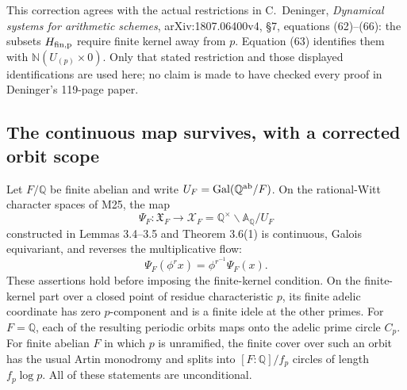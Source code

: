 This correction agrees with the actual restrictions in
C.~Deninger, \emph{Dynamical systems for arithmetic schemes},
arXiv:1807.06400v4, \S7, equations (62)--(66): the subsets
\(H_{\rm fin,p}\) require finite kernel away from \(p\).
Equation (63) identifies them with
\(\mathbb N(U_{(p)}\times0)\).
Only that stated restriction and those displayed identifications
are used here; no claim is made to have checked every proof in
Deninger's 119-page paper.

\subsection{The continuous map survives, with a corrected orbit scope}

\begin{proposition}
\label{AC-T16}
Let \(F/\mathbb Q\) be finite abelian and write
\(U_F=\operatorname{Gal}(\mathbb Q^{\rm ab}/F)\).
On the rational-Witt character spaces of M25, the map
\[
 \Psi_F:\mathfrak X_F\longrightarrow
 \mathscr X_F=\mathbb Q^\times\backslash\mathbb A_{\mathbb Q}/U_F
\]
constructed in Lemmas 3.4--3.5 and Theorem 3.6(1) is continuous,
Galois equivariant, and reverses the multiplicative flow:
\[
 \Psi_F(\phi^r x)=\phi^{r^{-1}}\Psi_F(x).
\]
These assertions hold before imposing the finite-kernel condition.
On the finite-kernel part over a closed point of residue
characteristic \(p\), its finite adelic coordinate has zero
\(p\)-component and is a finite idele at the other primes.
For \(F=\mathbb Q\), each of the resulting periodic orbits maps
onto the adelic prime circle \(C_p\).
For finite abelian \(F\) in which \(p\) is unramified, the finite
cover over such an orbit has the usual Artin monodromy and splits
into \([F:\mathbb Q]/f_p\) circles of length \(f_p\log p\).
All of these statements are unconditional.
\end{proposition}
